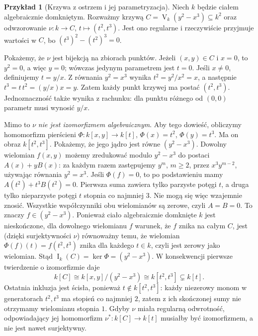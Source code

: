 \documentclass[11pt,a4paper,openany]{report}
\numberwithin{equation}{section}
\theoremstyle{plain}
\theoremstyle{definition}
\newtheorem{przyklad}[twierdzenie]{Przykład}
\theoremstyle{remark}
\newcommand{\V}{\operatorname V}
\newcommand{\I}{\operatorname I}
\newcommand{\kerf}{\operatorname{ker}}
\begin{document}
\begin{przyklad}[Krzywa z ostrzem i jej parametryzacja]
\label{pr:cusp}
Niech $k$ będzie ciałem algebraicznie domkniętym.
Rozważmy krzywą
$C=\V_k(y^2-x^3)\subseteq k^2$ oraz odwzorowanie
$\nu:k\to C$, $t\mapsto(t^2,t^3)$.
Jest ono regularne i rzeczywiście przyjmuje wartości w $C$,
bo $(t^3)^2-(t^2)^3=0$.

Pokażemy, że $\nu$ jest bijekcją na zbiorach punktów.
Jeżeli $(x,y)\in C$ i $x=0$, to $y^2=0$, a więc $y=0$;
wówczas jedynym parametrem jest $t=0$.
Jeśli $x\ne0$, definiujemy $t=y/x$. Z równania $y^2=x^3$
wynika $t^2=y^2/x^2=x$, a następnie
$t^3=t\,t^2=(y/x)x=y$. Zatem każdy punkt krzywej ma postać
$(t^2,t^3)$. Jednoznaczność także wynika z rachunku:
dla punktu różnego od $(0,0)$ parametr musi wynosić $y/x$.

Mimo to $\nu$ \emph{nie jest izomorfizmem algebraicznym}.
Aby tego dowieść, obliczymy homomorfizm pierścieni
$\Phi:k[x,y]\to k[t]$, $\Phi(x)=t^2$, $\Phi(y)=t^3$.
Ma on obraz $k[t^2,t^3]$.
Pokażemy, że jego jądro jest równe $(y^2-x^3)$.
Dowolny wielomian $f(x,y)$ możemy zredukować modulo
$y^2-x^3$ do postaci $A(x)+yB(x)$:
za każdym razem zastępujemy $y^m$, $m\ge2$, przez
$x^3y^{m-2}$, używając równania $y^2=x^3$.
Jeśli $\Phi(f)=0$, to po podstawieniu mamy
$A(t^2)+t^3B(t^2)=0$.
Pierwsza suma zawiera tylko parzyste potęgi $t$,
a druga tylko nieparzyste potęgi $t$ stopnia co najmniej $3$.
Nie mogą się więc wzajemnie znosić. Wszystkie współczynniki
obu wielomianów są zerowe, czyli $A=B=0$.
To znaczy $f\in(y^2-x^3)$.
Ponieważ ciało algebraicznie domknięte $k$ jest nieskończone,
dla dowolnego wielomianu $f$ warunek, że $f$ znika na
całym $C$, jest (dzięki surjektywności $\nu$) równoważny temu,
że wielomian $\Phi(f)(t)=f(t^2,t^3)$ znika dla każdego
$t\in k$, czyli jest zerowy jako wielomian.
Stąd $\I_k(C)=\kerf\Phi=(y^2-x^3)$.
W konsekwencji pierwsze twierdzenie o izomorfizmie daje
\[
k[C]\cong k[x,y]/(y^2-x^3)\cong k[t^2,t^3]\subsetneq k[t].
\]
Ostatnia inkluzja jest ścisła, ponieważ $t\notin k[t^2,t^3]$:
każdy niezerowy monom w generatorach $t^2,t^3$
ma stopień co najmniej $2$, zatem z ich skończonej sumy
nie otrzymamy wielomianu stopnia $1$.
Gdyby $\nu$ miała regularną odwrotność, odpowiadający jej
homomorfizm $\nu^*:k[C]\to k[t]$ musiałby być izomorfizmem,
a nie jest nawet surjektywny.
\end{przyklad}
\end{document}
